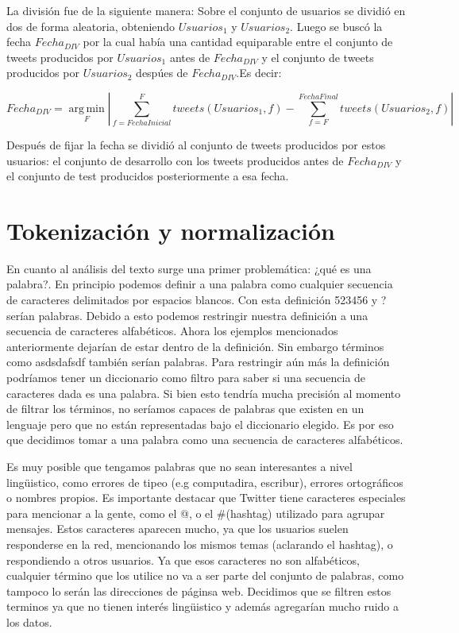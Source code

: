La división fue de la siguiente manera:
Sobre el conjunto de usuarios se dividió en dos de forma aleatoria, obteniendo $Usuarios_1$ y $Usuarios_2$. Luego se buscó la fecha $Fecha_{DIV}$ por la cual había una cantidad equiparable entre el conjunto de tweets producidos por  $Usuarios_1$ antes de $Fecha_{DIV}$ y el conjunto de tweets producidos por $Usuarios_2$ despúes de $Fecha_{DIV}$.Es decir:

\begin{equation}
 Fecha_{DIV}  = \operatorname*{arg\,min}_{F} \left|\sum_{ f = FechaInicial}^{F} tweets(Usuarios_1,f) - \sum_{ f = F}^{FechaFinal} tweets(Usuarios_2,f)\right|
\end{equation}

Después de fijar la fecha se dividió al conjunto de tweets producidos por estos usuarios: el conjunto de desarrollo con los tweets producidos antes de $Fecha_{DIV}$ y el conjunto de test producidos posteriormente a esa fecha.

\section{Tokenización y normalización}


En cuanto al análisis del texto surge una primer problemática: ¿qué es una palabra?. En principio podemos definir a una palabra como cualquier secuencia de caracteres delimitados por espacios blancos. Con esta definición 523456 y ? serían palabras. Debido a esto podemos restringir nuestra definición a una secuencia de caracteres alfabéticos. Ahora los ejemplos mencionados anteriormente dejarían de estar dentro de la definición. Sin embargo términos como asdsdafsdf también serían palabras. Para restringir aún más la definición podríamos tener un diccionario como filtro para saber si una secuencia de caracteres dada es una palabra. Si bien esto tendría mucha precisión al momento de filtrar los términos, no seríamos capaces de palabras que existen en un lenguaje pero que no están representadas bajo el diccionario elegido. Es por eso que decidimos tomar a una palabra como una secuencia de caracteres alfabéticos.

Es muy posible que tengamos palabras que no sean interesantes a nivel lingüistico, como errores de tipeo (e.g computadira, escribur), errores ortográficos o  nombres propios. Es importante destacar que Twitter tiene caracteres especiales para mencionar a la gente, como el @, o el \#(hashtag) utilizado para agrupar mensajes. Estos caracteres aparecen mucho, ya que los usuarios suelen responderse en la red, mencionando los mismos temas (aclarando el hashtag), o respondiendo a otros usuarios. Ya que esos caracteres no son alfabéticos, cualquier término que los utilice no va a ser parte del conjunto de palabras, como tampoco lo serán las direcciones de páginsa web. Decidimos que se filtren estos terminos ya que no tienen interés lingüistico y además agregarían mucho ruido a los datos.

